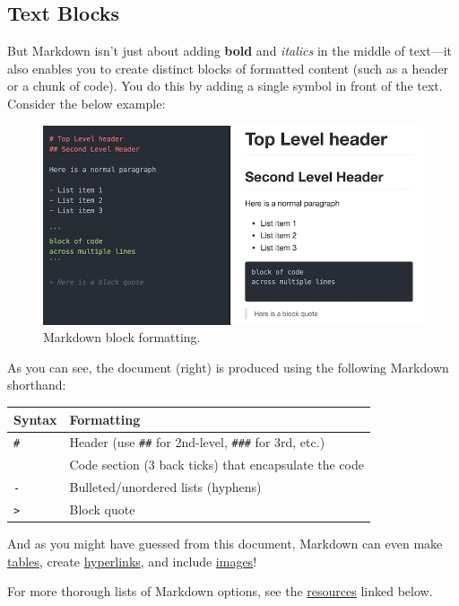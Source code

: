 \documentclass[]{book}
\theoremstyle{definition}
\theoremstyle{definition}
\theoremstyle{remark}
\begin{document}
\subsection{Text Blocks}\label{text-blocks}

But Markdown isn't just about adding \textbf{bold} and \emph{italics} in
the middle of text---it also enables you to create distinct blocks of
formatted content (such as a header or a chunk of code). You do this by
adding a single symbol in front of the text. Consider the below example:

\begin{figure}
\centering
\includegraphics{img/markdown/markdown-blocks.png}
\caption{Markdown block formatting.}
\end{figure}

As you can see, the document (right) is produced using the following
Markdown shorthand:

\begin{longtable}[]{@{}ll@{}}
\toprule
Syntax & Formatting\tabularnewline
\midrule
\endhead
\texttt{\#} & Header (use \texttt{\#\#} for 2nd-level, \texttt{\#\#\#}
for 3rd, etc.)\tabularnewline
\texttt{\textasciigrave{}\textasciigrave{}\textasciigrave{}} & Code
section (3 back ticks) that encapsulate the code\tabularnewline
\texttt{-} & Bulleted/unordered lists (hyphens)\tabularnewline
\texttt{\textgreater{}} & Block quote\tabularnewline
\bottomrule
\end{longtable}

And as you might have guessed from this document, Markdown can even make
\href{https://help.github.com/articles/organizing-information-with-tables/}{tables},
create
\href{https://daringfireball.net/projects/markdown/syntax\#link}{hyperlinks},
and include
\href{https://daringfireball.net/projects/markdown/syntax\#img}{images}!

For more thorough lists of Markdown options, see the
\protect\hyperlink{resources}{resources} linked below.
\end{document}
